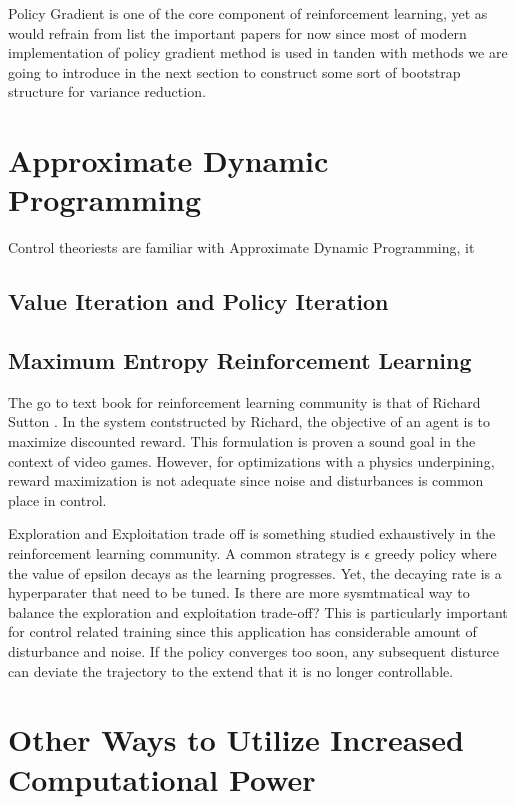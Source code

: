 \documentclass[journal]{IEEEtran}
\begin{document}
Policy Gradient is one of the core component of reinforcement learning, yet as would refrain from list the important papers for now since most of modern implementation of policy gradient method is used in tanden with methods we are going to introduce in the next section to construct some sort of bootstrap structure for variance reduction.

\section{Approximate Dynamic Programming}
Control theoriests are familiar with Approximate Dynamic Programming, it






\subsection{Value Iteration and Policy Iteration}
\subsection{Maximum Entropy Reinforcement Learning}

The go to text book for reinforcement learning community is that of Richard Sutton \cite{Sutton1998IntroductionTR}. In the system contstructed by Richard, the objective of an agent is to maximize discounted reward. This formulation is proven a sound goal in the context of video games. However, for optimizations with a physics underpining, reward maximization is not adequate since noise and disturbances is common place in control.

Exploration and Exploitation trade off is something studied exhaustively in the reinforcement learning community. A common strategy is $\epsilon$ greedy policy where the value of epsilon decays as the learning progresses. Yet, the decaying rate is a hyperparater that need to be tuned. Is there are more sysmtmatical way to balance the exploration and exploitation trade-off? This is particularly important for control related training since this application has considerable amount of disturbance and noise. If the policy converges too soon, any subsequent disturce can deviate the trajectory to the extend that it is no longer controllable.



\section{Other Ways to Utilize Increased Computational Power}
\end{document}
